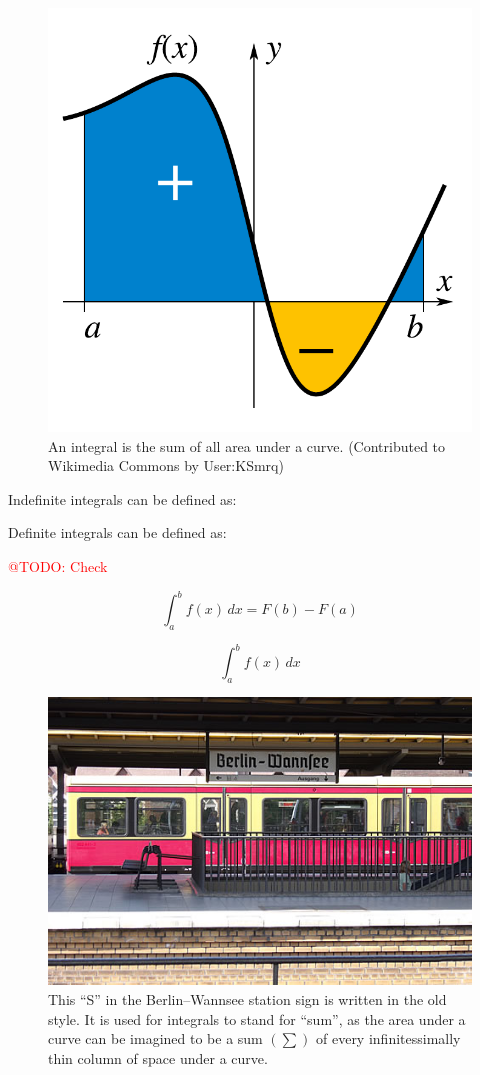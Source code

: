 \documentclass[a4paper,10pt]{scrartcl}
\makeatletter
\newcommand{\todo}[1]{\textcolor{red}{@TODO: #1}}
\makeatother
\begin{document}
\begin{figure}[!ht]
\begin{center}
\includegraphics[width=.5\linewidth]{figures/NumericalAndMath/IntegralExample.pdf}
\end{center}
\caption{An integral is the sum of all area under a curve. (Contributed to Wikimedia Commons by User:KSmrq)}
\end{figure}

Indefinite integrals can be defined as:

Definite integrals can be defined as:

\todo{Check}

\begin{equation}
\int_a^b \! f(x)\,dx = F(b) - F(a)
\end{equation}

\begin{equation}
\int_a^b \! f(x)\,dx
\end{equation}

\begin{figure}[!ht]
\begin{center}
\includegraphics[width=.5\linewidth]{figures/NumericalAndMath/BerlinWannsee.jpg}
\end{center}
\caption{This ``S'' in the Berlin--Wannsee station sign is written in the old style. It is used for integrals to stand for ``sum'', as the area under a curve can be imagined to be a sum $\left( \sum \right)$ of every infinitessimally thin column of space under a curve.}
\end{figure}
\end{document}
